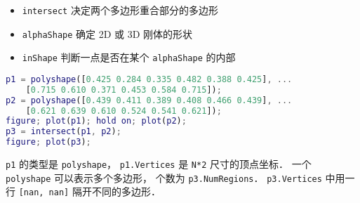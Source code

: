 
\begin{issues}
\issueDraft
\end{issues}

\begin{itemize}
\item \verb|intersect| 决定两个多边形重合部分的多边形
\item \verb|alphaShape| 确定 2D 或 3D 刚体的形状
\item \verb|inShape| 判断一点是否在某个 \verb|alphaShape| 的内部
\end{itemize}


\begin{lstlisting}[language=matlab]
p1 = polyshape([0.425 0.284 0.335 0.482 0.388 0.425], ...
    [0.715 0.610 0.371 0.453 0.584 0.715]);
p2 = polyshape([0.439 0.411 0.389 0.408 0.466 0.439], ...
    [0.621 0.639 0.610 0.524 0.541 0.621]);
figure; plot(p1); hold on; plot(p2);
p3 = intersect(p1, p2);
figure; plot(p3);
\end{lstlisting}
\verb|p1| 的类型是 \verb|polyshape|， \verb|p1.Vertices| 是 \verb|N*2| 尺寸的顶点坐标． 一个 \verb|polyshape| 可以表示多个多边形， 个数为 \verb|p3.NumRegions|． \verb|p3.Vertices| 中用一行 \verb|[nan, nan]| 隔开不同的多边形．
